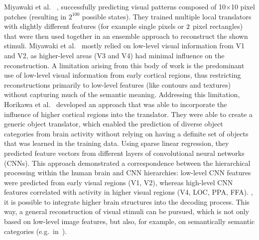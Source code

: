 Miyawaki et al.~\cite{miyawakiVisualImageReconstruction2008} , successfully predicting visual patterns composed of 10$\times$10 pixel patches (resulting in $2^{100}$ possible states). They trained multiple local translators with slightly different features (for example single pixels or $2\time1$ pixel rectangles) that were then used together in an ensemble approach to reconstruct the shown stimuli. Miyawaki et al.~\cite{miyawakiVisualImageReconstruction2008} mostly relied on low-level visual information from V1 and V2, as higher-level areas (V3 and V4) had minimal influence on the reconstruction. 
A limitation arising from this body of work is the predominant use of low-level visual information from early cortical regions, thus restricting reconstructions primarily to low-level features (like contours and textures) without capturing much of the semantic meaning. Addressing this limitation, Horikawa et al.~\cite{horikawaGenericDecodingSeen2017} developed an approach that was able to incorporate the influence of higher cortical regions into the translator. They were able to create a generic object translator, which enabled the prediction of diverse object categories from brain activity without relying on having a definite set of objects that was learned in the training data. Using sparse linear regression, they predicted feature vectors from different layers of convolutional neural networks (CNNs). This approach demonstrated a correspondence between the hierarchical processing within the human brain and CNN hierarchies: low-level CNN features were predicted from early visual regions (V1, V2), whereas high-level CNN features correlated with activity in higher visual regions (V4, LOC, PPA, FFA). , it is possible to integrate higher brain structures into the decoding process. This way, a general reconstruction of visual stimuli can be pursued, which is not only based on low-level image features, but also, for example, on semantically semantic categories (e.g.\ in~\cite{shenDeepImageReconstruction2019,ozcelikNaturalSceneReconstruction2023}). 

